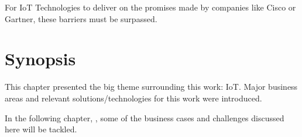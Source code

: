 For \gls{IoT} Technologies to deliver on the promises made by companies like Cisco or Gartner, these barriers must be surpassed.

\section{Synopsis}
\label{sec:stateofart:synopsis}

This chapter presented the big theme surrounding this work: \gls{IoT}.
Major business areas and relevant solutions/technologies for this work were introduced.

In the following chapter, , some of the business cases and challenges discussed here will be tackled.
